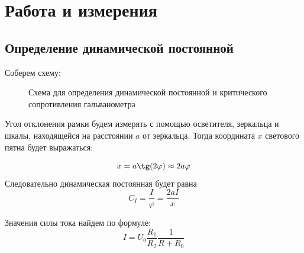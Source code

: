 \documentclass[a4paper, 12pt]{article}
\begin{document}
\section{Работа и измерения}


\subsection*{Определение динамической постоянной}

Соберем схему:

	\begin {figure}[H]
		\begin{center}
			\caption{Схема для определения динамической постоянной и критического сопротивления гальванометра}
		\end{center}
	\end {figure}

Угол отклонения рамки будем измерять с помощью осветителя, зеркальца и шкалы, находящейся на расстоянии $a$ от зеркальца. Тогда координата $x$ светового пятна будет выражаться:

$$x=a\tg(2\varphi) \approx 2a\varphi$$
Следовательно динамическая постоянная будет равна 
$$C_I = \dfrac{I}{\varphi} = \dfrac{2aI}{x}$$

Значения силы тока найдем по формуле: $$I = U_0 \dfrac{R_1}{R_2}\dfrac{1}{R+R_0}$$


\begin{table}[H]
\centering
{}
\caption{Полученные значения}
\end{table}
\end{document}
